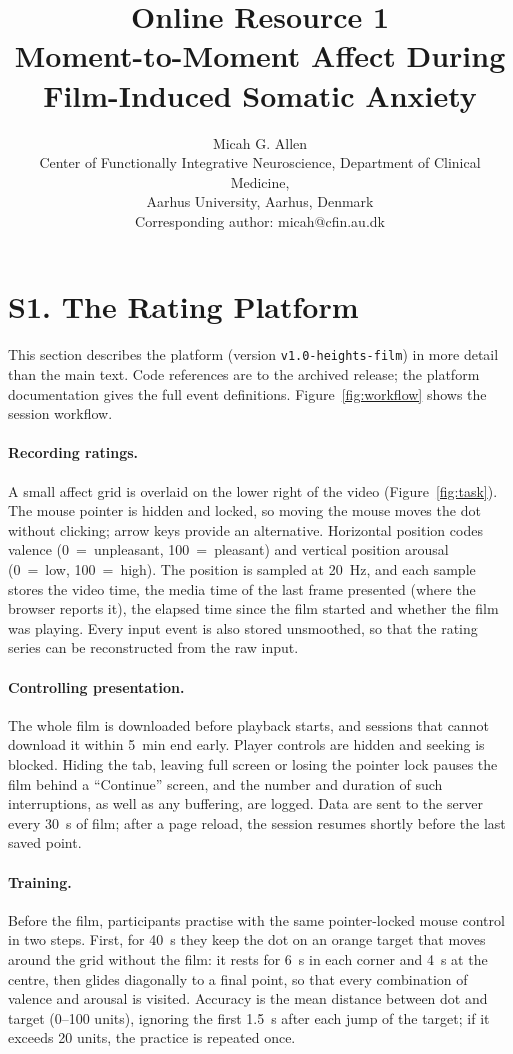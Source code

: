\documentclass[11pt,a4paper]{article}
\title{Online Resource 1\\[4pt]\large Moment-to-Moment Affect During Film-Induced Somatic Anxiety}
\author{Micah G. Allen\\[2pt]
\small Center of Functionally Integrative Neuroscience, Department of Clinical Medicine,\\
\small Aarhus University, Aarhus, Denmark\\
\small Corresponding author: micah@cfin.au.dk}
\date{}
\begin{document}
\maketitle
\linenumbers

\section*{S1. The Rating Platform}

This section describes the platform (version \texttt{v1.0-heights-film}) in more detail than the main text. Code
references are to the archived release; the platform documentation gives the full event definitions. Figure~\ref{fig:workflow} shows the session workflow.

\paragraph{Recording ratings.} A small affect grid is overlaid on the lower right of the video
(Figure~\ref{fig:task}). The mouse pointer is hidden and locked, so moving the mouse moves the dot without clicking;
arrow keys provide an alternative. Horizontal position codes valence (0~=~unpleasant, 100~=~pleasant) and vertical
position arousal (0~=~low, 100~=~high). The position is sampled at 20~Hz, and each sample stores the video time, the
media time of the last frame presented (where the browser reports it), the elapsed time since the film started and
whether the film was playing. Every input event is also stored unsmoothed, so that the rating series can be
reconstructed from the raw input.

\paragraph{Controlling presentation.} The whole film is downloaded before playback starts, and sessions that cannot
download it within 5~min end early. Player controls are hidden and seeking is blocked. Hiding the tab, leaving full
screen or losing the pointer lock pauses the film behind a \enquote{Continue} screen, and the number and duration of
such interruptions, as well as any buffering, are logged. Data are sent to the server every 30~s of film; after a page
reload, the session resumes shortly before the last saved point.

\paragraph{Training.} Before the film, participants practise with the same pointer-locked mouse control in two steps.
First, for 40~s they keep the dot on an orange target that moves around the grid without the film: it rests for 6~s in
each corner and 4~s at the centre, then glides diagonally to a final point, so that every combination of valence and
arousal is visited. Accuracy is the mean distance between dot and target (0--100 units), ignoring the first 1.5~s after
each jump of the target; if it exceeds 20 units, the practice is repeated once.
\end{document}
